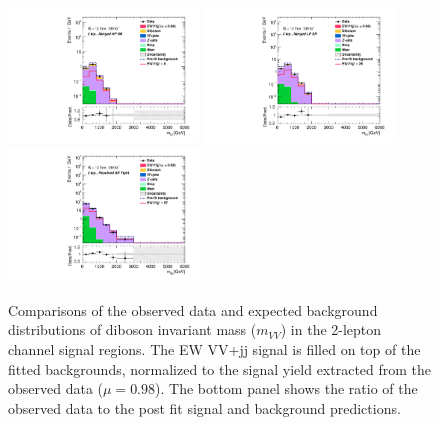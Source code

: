 \begin{figure}[]
    \centering
    \includegraphics[width=0.45\textwidth]{figures/PostFit/Region_distMllJ_DSRVBSHP_BMin0_J0_incJet1_L2_T0_incFat1_Y6051_incTag1_Fat1_GlobalFit_unconditionnal_mu1log.pdf}
    \includegraphics[width=0.45\textwidth]{figures/PostFit/Region_distMllJ_DSRVBSLP_BMin0_J0_incJet1_L2_T0_incFat1_Y6051_incTag1_Fat1_GlobalFit_unconditionnal_mu1log.pdf}
    \includegraphics[width=0.45\textwidth]{figures/PostFit/Region_distMlljj_DSRVBSFid_BMin0_T0_Y6051_incTag1_J2_L2_incJet1_GlobalFit_unconditionnal_mu1log.pdf}
    \caption{Comparisons of the observed data and expected background distributions of diboson invariant mass ($m_{VV}$) in the 2-lepton channel signal regions. The EW VV+jj signal is filled on top of the fitted backgrounds, normalized to the signal yield extracted from the observed data ($\mu = 0.98$). The bottom panel shows the ratio of the observed data to the post fit signal and background predictions.}
    \label{fig:postSR2lepmvv}
\end{figure}

